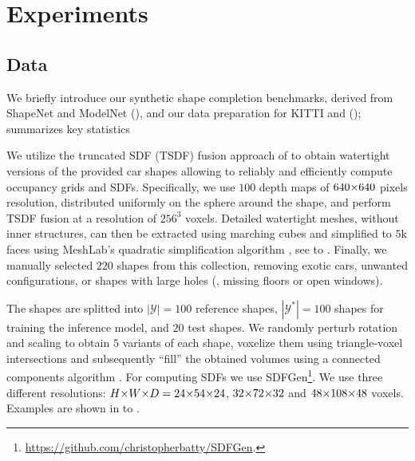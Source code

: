 \section{Experiments}

\subsection{Data}
\label{sec:data}

We briefly introduce our synthetic shape completion benchmarks, derived from ShapeNet \citep{Chang2015ARXIV} and ModelNet \citep{Wu2015CVPR} (\cf {}), and our data preparation for KITTI \citep{Geiger2012CVPR} and \Kinect \citep{Yang2018ARXIVb} (\cf {});  summarizes key statistics 

%
We utilize the truncated SDF (TSDF) fusion approach of \cite{Riegler2017THREEDV} to obtain watertight versions of the provided car shapes allowing to reliably and efficiently compute occupancy grids and SDFs. Specifically, we use $100$ depth maps of $640 \operatorname*{\!\times\!} 640$ pixels resolution, distributed uniformly on the sphere around the shape, and perform TSDF fusion at a resolution of $256^3$ voxels. Detailed watertight meshes, without inner structures, can then be extracted using marching cubes \citep{Lorensen1987SIGGRAPH} and simplified to $5\text{k}$ faces using MeshLab's quadratic simplification algorithm \citep{Cignoni2008EICC}, see  to . Finally, we manually selected $220$ shapes from this collection, removing exotic cars, unwanted configurations, or shapes with large holes (\eg, missing floors or open windows).

The shapes are splitted into $|\mathcal{Y}| = 100$ reference shapes, $|\mathcal{Y}^*| = 100$ shapes for training the inference model, and $20$ test shapes. We randomly perturb rotation and scaling to obtain $5$ variants of each shape, voxelize them using triangle-voxel intersections and subsequently ``fill'' the obtained volumes using a connected components algorithm \citep{Jones2001}. For computing SDFs we use SDFGen\footnote{\url{https://github.com/christopherbatty/SDFGen}.}. We use three different resolutions: $H \ntimes W \ntimes D = 24 \ntimes 54 \ntimes 24$, $32 \operatorname*{\!\times\!} 72 \operatorname*{\!\times\!} 32$ and $48 \operatorname*{\!\times\!} 108 \operatorname*{\!\times\!} 48$ voxels. Examples are shown in  to .

